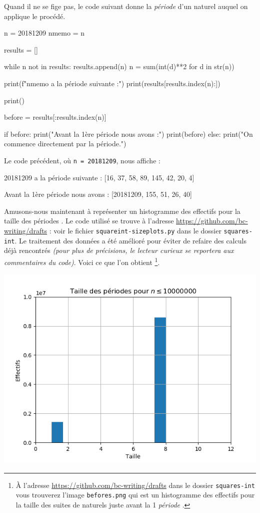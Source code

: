 Quand il ne se fige pas, le code suivant donne la \textit{\og période \fg} d'un naturel auquel on applique le procédé.

\begin{rawcode}
n     = 20181209
nmemo = n

results = []

while n not in results:
    results.append(n)
    n = sum(int(d)**2 for d in str(n))

print(f"{nmemo} a la période suivante :")
print(results[results.index(n):])

print()

before = results[:results.index(n)]

if before:
    print("Avant la 1ère période nous avons :")
    print(before)
else:
    print("On commence directement par la période.")
\end{rawcode}

\medskip

Le code précédent, où \verb+n = 20181209+, nous affiche :

\begin{rawcode}
20181209 a la période suivante :
[16, 37, 58, 89, 145, 42, 20, 4]

Avant la 1ère période nous avons :
[20181209, 155, 51, 26, 40]
\end{rawcode}


\medskip

Amusons-nous maintenant à représenter un histogramme des effectifs pour la taille des \og périodes \fg{}.
Le code utilisé se trouve à l'adresse \url{https://github.com/bc-writing/drafts} : voir le fichier \texttt{squareint-sizeplots.py} dans le dossier \texttt{squares-int}.
Le traitement des données a été amélioré pour éviter de refaire des calculs déjà rencontrés \emph{(pour plus de précisions, le lecteur curieux se reportera aux commentaires du code)}.
Voici ce que l'on obtient
\footnote{
	À l'adresse \url{https://github.com/bc-writing/drafts} dans le dossier \texttt{squares-int} vous trouverez l'image \texttt{befores.png} qui est un histogramme des effectifs pour la taille des suites de naturels juste avant la 1\iere{} \emph{\og période \fg{}}.
}.

\begin{center}
	\includegraphics[scale=.9]{squares-int/periods.png}
\end{center}


